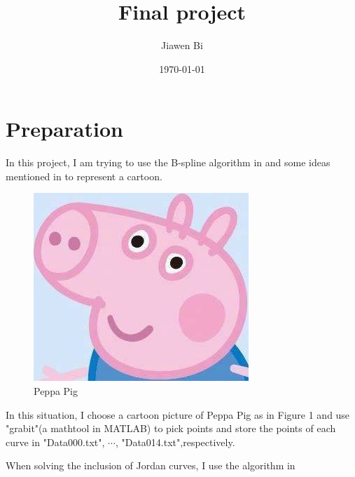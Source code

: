 \documentclass[]{article}
\title{Final project}
\author{Jiawen Bi}
\date{\today}
\begin{document}
\maketitle


\section{Preparation}
In this project, I am trying to use the B-spline algorithm in \cite{numana} and some ideas mentioned in \cite{zhang2019fluid} to represent a cartoon.
\par
\begin{figure}[ht]
	\centering
	\includegraphics[scale = 0.8]{fig.jpg}
	\caption{Peppa Pig}
	\label{fig:fig}
\end{figure}
In this situation, I choose a cartoon picture of Peppa Pig as in Figure 1
and use "grabit"(a mathtool in MATLAB) to pick points and store the points of each curve in "Data000.txt", $\cdots$, "Data014.txt",respectively.\par
When solving the inclusion of Jordan curves, I use the algorithm in \cite{}


\end{document}
